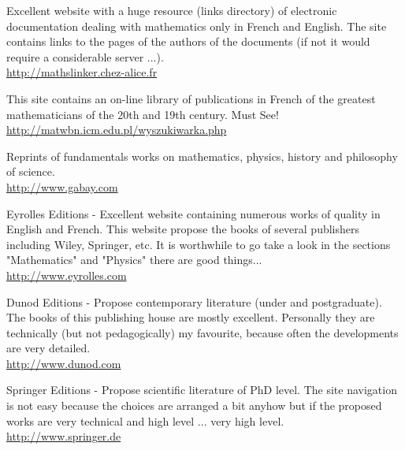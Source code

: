 	{\Large {}}{\Large {}}{\Large {}}{\Large {}}\bcdfrance{} Excellent website with a huge resource (links directory) of electronic documentation dealing with mathematics only in French and English. The site contains links to the pages of the authors of the documents (if not it would require a considerable server ...).\\
	\href{http://mathslinker.chez-alice.fr}{\color{blue}http://mathslinker.chez-alice.fr}
	
	{\Large {}}\bcdfrance{} This site contains an on-line library of publications in French of the greatest mathematicians of the 20th and 19th century. Must See!\\
	\href{http://matwbn.icm.edu.pl/wyszukiwarka.php}{\color{blue}http://matwbn.icm.edu.pl/wyszukiwarka.php}
	
	{\Large {}}{\Large {}}{\Large {}}{\Large {}}\bcdfrance{} Reprints of fundamentals works on mathematics, physics, history and philosophy of science.\\
	\href{http://www.gabay.com}{\color{blue}http://www.gabay.com}
	
	\pagebreak
	{\Large {}}{\Large {}}{\Large {}}{\Large {}}\bcdfrance{} Eyrolles Editions - Excellent website containing numerous works of quality in English and French. This website propose the books of several publishers including Wiley, Springer, etc. It is worthwhile to go take a look in the sections "Mathematics" and "Physics" there are good things... \\
	\href{http://www.eyrolles.com}{\color{blue}http://www.eyrolles.com}
	
	{\Large {}}{\Large {}}{\Large {}}{\Large {}}\bcdfrance{} Dunod Editions - Propose contemporary literature (under and postgraduate). The books of this publishing house are mostly excellent. Personally they are technically (but not pedagogically) my favourite, because often the developments are very detailed.\\
	\href{http://www.dunod.com}{\color{blue}http://www.dunod.com}
	
	{\Large {}}{\Large {}} Springer Editions - Propose scientific literature of PhD level. The site navigation is not easy because the choices are arranged a bit anyhow but if the proposed works are very technical and high level ... very high level.\\
	\href{http://www.springer.de}{\color{blue}http://www.springer.de}
	
